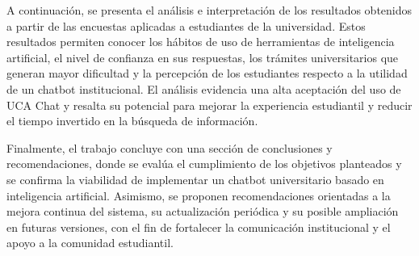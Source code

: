 {A continuación, se presenta el análisis e interpretación de los resultados obtenidos a partir de las encuestas aplicadas a estudiantes de la universidad. Estos resultados permiten conocer los hábitos de uso de herramientas de inteligencia artificial, el nivel de confianza en sus respuestas, los trámites universitarios que generan mayor dificultad y la percepción de los estudiantes respecto a la utilidad de un chatbot institucional. El análisis evidencia una alta aceptación del uso de UCA Chat y resalta su potencial para mejorar la experiencia estudiantil y reducir el tiempo invertido en la búsqueda de información.

Finalmente, el trabajo concluye con una sección de conclusiones y recomendaciones, donde se evalúa el cumplimiento de los objetivos planteados y se confirma la viabilidad de implementar un chatbot universitario basado en inteligencia artificial. Asimismo, se proponen recomendaciones orientadas a la mejora continua del sistema, su actualización periódica y su posible ampliación en futuras versiones, con el fin de fortalecer la comunicación institucional y el apoyo a la comunidad estudiantil.
}




